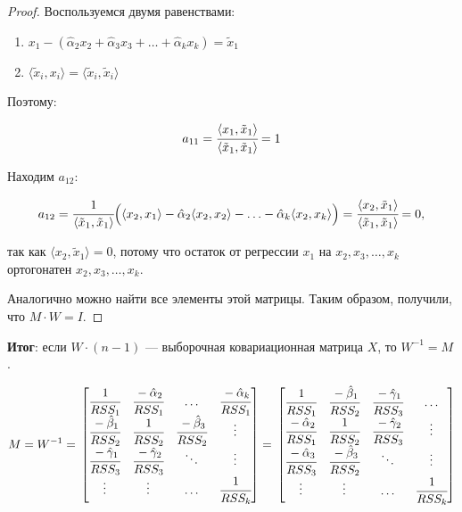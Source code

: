 \documentclass[12pt]{article} %
\theoremstyle{definition} %
\begin{document}
\begin{proof}
Воспользуемся двумя равенствами:

\begin{enumerate}
    \item $x_1 - (\hat \alpha_2 x_2 + \hat \alpha_3 x_3 + \ldots + \hat \alpha_k x_k) = \tilde x_1$
    \item $\langle \tilde x_i, x_i \rangle = \langle \tilde x_i, \tilde x_i \rangle $
\end{enumerate}

Поэтому:

\[
    a_{11} = \cfrac{\langle x_1,\tilde x_1 \rangle}{\langle\tilde x_1,\tilde x_1 \rangle} = 1 
\]  

Находим $a_{12}$:

\[   
    a_{12} =
    \cfrac{1}{\langle\tilde x_1,\tilde x_1 \rangle} \Big ( \langle x_2, x_1 \rangle - \hat \alpha_2  \langle x_2, x_2 \rangle  
    - \ldots -  \hat \alpha_k  \langle x_2, x_k \rangle   \Big ) = \\
    \cfrac{\langle x_2,\tilde x_1 \rangle}{\langle\tilde x_1,\tilde x_1 \rangle} = 0,
\]

так как $\langle x_2,\tilde x_1 \rangle = 0$, потому что остаток от регрессии $x_1$ на $x_2,x_3, \dots, x_k$  ортогонатен $x_2,x_3, \dots, x_k$.

Аналогично можно найти все элементы этой матрицы. Таким образом, получили, что $ M \cdot W = I $.

\end{proof}

 \textbf{Итог}: если $W \cdot (n-1)$  — выборочная ковариационная матрица $X$, то $W^{-1} = M$.
 
 \[ 
 M = W^{-1} = \\
    \begin{bmatrix}
        \cfrac{1}{RSS_1} & \cfrac{-\hat\alpha_2}{RSS_1} & \ldots &  \cfrac{- \hat\alpha_k}{RSS_1} \\
        \cfrac{-\hat\beta_1}{RSS_2} & \cfrac{1}{RSS_2} & \cfrac{-\hat\beta_3}{RSS_2}  & \vdots \\
        \cfrac{-\hat\gamma_1}{RSS_3} & \cfrac{-\hat\gamma_2}{RSS_3} & \ddots & \vdots \\
        \vdots & \vdots & \ldots & \cfrac{1}{RSS_k} \\
     \end{bmatrix}
     = \\
    \begin{bmatrix}
        \cfrac{1}{RSS_1} & \cfrac{-\hat\beta_1}{RSS_2} & \cfrac{-\hat\gamma_1}{RSS_3} & \ldots \\
        \cfrac{-\hat\alpha_2}{RSS_1} & \cfrac{1}{RSS_2} & \cfrac{-\hat\gamma_2}{RSS_3}  & \vdots \\
        \cfrac{-\hat\alpha_3}{RSS_3} & \cfrac{-\hat\beta_3}{RSS_2} & \ddots & \vdots \\
        \vdots & \vdots & \ldots & \cfrac{1}{RSS_k} \\
     \end{bmatrix}
 \]
\end{document}
